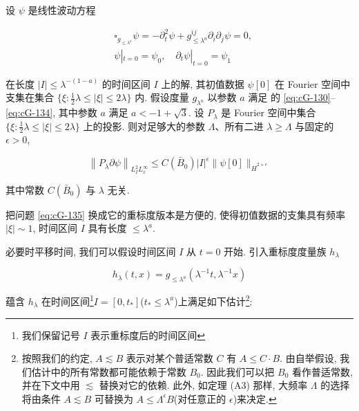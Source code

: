 \begin{theorem}[A4]\label{thm:cG-6.15}
设 $\psi$ 是线性波动方程

\begin{equation}
\begin{aligned}
&\square_{g_{\leq\lambda^{a}}}\psi = -\partial_{t}^{2}\psi + g_{\leq\lambda^{a}}^{ij}\partial_{i}\partial_{j}\psi = 0,  \\
&\psi|_{t = 0} = \psi_{0},  \quad \partial_{t}\psi|_{t = 0} = \psi_{1}
\end{aligned}\label{eq:cG-135}
\end{equation}

在长度 $|I|\leq \lambda^{-(1 - a)}$ 的时间区间 $I$ 上的解, 其初值数据 $\psi [0]$ 在 Fourier 空间中支集在集合 $\{\xi :\frac{1}{2}\lambda \leq |\xi |\leq 2\lambda \}$ 内. 假设度量 $g_{\lambda^a}$ 以参数 $a$ 满足  的 \eqref{eq:cG-130}--\eqref{eq:cG-134}, 其中参数 $a$ 满足 $a < -1 + \sqrt{3}$. 设 $P_{\lambda}$ 是 Fourier 空间中集合 $\{\xi :\frac{1}{2}\lambda \leq |\xi |\leq 2\lambda \}$ 上的投影. 则对足够大的参数 $\Lambda$、所有二进 $\lambda \geq \Lambda$ 与固定的 $\epsilon >0$, 

\begin{equation}
\left\|P_{\lambda}\partial\psi\right\|_{L_{I}^{2}L_{x}^{\infty}} \leq C(\bar{B}_{0})|I|^{\epsilon}\|\psi[0]\|_{\dot{H}^{2 + \epsilon}}\label{eq:cG-136}
\end{equation}

其中常数 $C(\bar{B}_0)$ 与 $\lambda$ 无关. 
\end{theorem}


把问题 \eqref{eq:cG-135} 换成它的重标度版本是方便的, 使得初值数据的支集具有频率 $|\xi| \sim 1$, 时间区间 $I$ 具有长度 $\leq \lambda^a$. 

必要时平移时间, 我们可以假设时间区间 $I$ 从 $t = 0$ 开始. 引入重标度度量族 $h_{\lambda}$

\begin{equation}
h_{\lambda}(t,  x) = g_{\leq\lambda^{a}}(\lambda^{-1}t,  \lambda^{-1}x)\label{eq:cG-137}
\end{equation}

 蕴含 $h_{\lambda}$ 在时间区间\footnote{我们保留记号 $I$ 表示重标度后的时间区间}$I = [0,  t_{*}]$($t_{*} \leq \lambda^{a}$)上满足如下估计\footnote{按照我们的约定, $A \lesssim B$ 表示对某个普适常数 $C$ 有 $A \leq C\cdot B$. 由自举假设, 我们估计中的所有常数都可能依赖于常数 $B_0$. 因此我们可以把 $B_0$ 看作普适常数, 并在下文中用 $\lesssim$ 替换对它的依赖. 此外, 如定理 (A3) 那样, 大频率 $\Lambda$ 的选择将由条件 $A \lesssim B$ 可替换为 $A \leq \Lambda^{\epsilon}B$(对任意正的 $\epsilon$)来决定. }:

